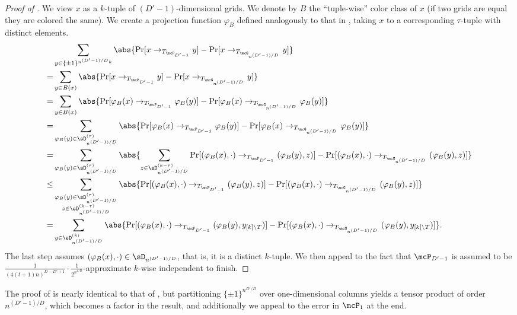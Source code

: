 \begin{proof}[Proof of ]
We view $x$ as a $k$-tuple of $(D'-1)$-dimensional grids. We denote by $B$ the ``tuple-wise'' color class of $x$ (if two grids are equal they are colored the same). We create a projection function $\varphi_B$ defined analogously to that in , taking $x$ to a corresponding $\tau$-tuple with distinct elements.
    \begin{align*}
    &\sum_{y \in \{\pm1\}^{n^{(D'-1)/D}k}} \abs{\Pr[x \to_{T_{\mcP_{D'-1}}} y] - \Pr[x \to_{T_{\mcG_{n^{(D'-1)/D}}}} y]}\\
    =&\sum_{y \in B(x)} \abs{\Pr[x \to_{T_{\mcP_{D'-1}}} y] - \Pr[x \to_{T_{\mcG_{n^{(D'-1)/D}}}} y]}\\
    =& \sum_{y \in B(x)} \abs{\Pr[\varphi_B(x) \to_{T_{\mcP_{D'-1}}} \varphi_B(y)] - \Pr[\varphi_B(x) \to_{T_{\mcG_{n^{(D'-1)/D}}}} \varphi_B(y)]}\\
    =& \sum_{\varphi_B(y) \in \sD_{n^{(D'-1)/D}}^{(\tau)}} \abs{\Pr[\varphi_B(x) \to_{T_{\mcP_{D'-1}}} \varphi_B(y)] - \Pr[\varphi_B(x) \to_{T_{\mcG_{n^{(D'-1)/D}}}} \varphi_B(y)]}\\
    =& \sum_{\varphi_B(y) \in \sD_{n^{(D'-1)/D}}^{(\tau)}} \abs{\sum_{z \in \sD_{n^{(D'-1)/D}}^{(k-\tau)}}\Pr[(\varphi_B(x), \cdot) \to_{T_{\mcP_{D'-1}}} (\varphi_B(y), z)] - \Pr[(\varphi_B(x), \cdot) \to_{T_{\mcG_{n^{(D'-1)/D}}}} (\varphi_B(y), z)]}\\
    \leq& \sum_{\substack{\varphi_B(y) \in \sD_{n^{(D'-1)/D}}^{(\tau)} \\ z \in \sD_{n^{(D'-1)/D}}^{(k-\tau)}}} \abs{\Pr[(\varphi_B(x), \cdot) \to_{T_{\mcP_{D'-1}}} (\varphi_B(y), z)] - \Pr[(\varphi_B(x), \cdot) \to_{T_{\mcG_{n^{(D'-1)/D}}}} (\varphi_B(y), z)]}\\
    =& \sum_{y \in \sD^{(k)}_{n^{(D'-1)/D}}} \abs{\Pr[(\varphi_B(x), \cdot) \to_{T_{\mcP_{D'-1}}} (\varphi_B(y), y_{[k] \setminus T})] - \Pr[(\varphi_B(x), \cdot) \to_{T_{\mcG_{n^{(D'-1)/D}}}} (\varphi_B(y), y_{[k] \setminus T})]}.
\end{align*}
The last step assumes $(\varphi_B(x), \cdot) \in \sD_{n^{(D'-1)/D}}$, that is, it is a distinct $k$-tuple. We then appeal to the fact that ${\mcP_{D'-1}}$ is assumed to be $\frac{1}{(4(t+1)n)^{D-D'+1}} \cdot \frac1{2^{n^{1/D}}}$-approximate $k$-wise independent to finish.
\end{proof}

The proof of  is nearly identical to that of , but partitioning $\{\pm1\}^{n^{D'/D}}$ over one-dimensional columns yields a tensor product of order $n^{(D'-1)/D}$, which becomes a factor in the result, and additionally we appeal to the error in $\mcP_1$ at the end.


